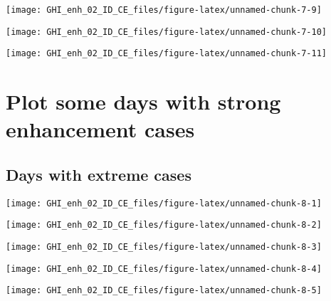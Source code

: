 \documentclass[
  10pt,
  a4paper,oneside]{article}
\begin{document}
\begin{center}\texttt{[image: GHI\_enh\_02\_ID\_CE\_files/figure-latex/unnamed-chunk-7-9]} \end{center}

\begin{center}\texttt{[image: GHI\_enh\_02\_ID\_CE\_files/figure-latex/unnamed-chunk-7-10]} \end{center}

\begin{center}\texttt{[image: GHI\_enh\_02\_ID\_CE\_files/figure-latex/unnamed-chunk-7-11]} \end{center}

\FloatBarrier

\hypertarget{plot-some-days-with-strong-enhancement-cases}{%
\section{Plot some days with strong enhancement cases}\label{plot-some-days-with-strong-enhancement-cases}}

\FloatBarrier

\hypertarget{days-with-extreme-cases}{%
\subsection{Days with extreme cases}\label{days-with-extreme-cases}}

\begin{center}\texttt{[image: GHI\_enh\_02\_ID\_CE\_files/figure-latex/unnamed-chunk-8-1]} \end{center}

\begin{center}\texttt{[image: GHI\_enh\_02\_ID\_CE\_files/figure-latex/unnamed-chunk-8-2]} \end{center}

\begin{center}\texttt{[image: GHI\_enh\_02\_ID\_CE\_files/figure-latex/unnamed-chunk-8-3]} \end{center}

\begin{center}\texttt{[image: GHI\_enh\_02\_ID\_CE\_files/figure-latex/unnamed-chunk-8-4]} \end{center}

\begin{center}\texttt{[image: GHI\_enh\_02\_ID\_CE\_files/figure-latex/unnamed-chunk-8-5]} \end{center}
\end{document}
